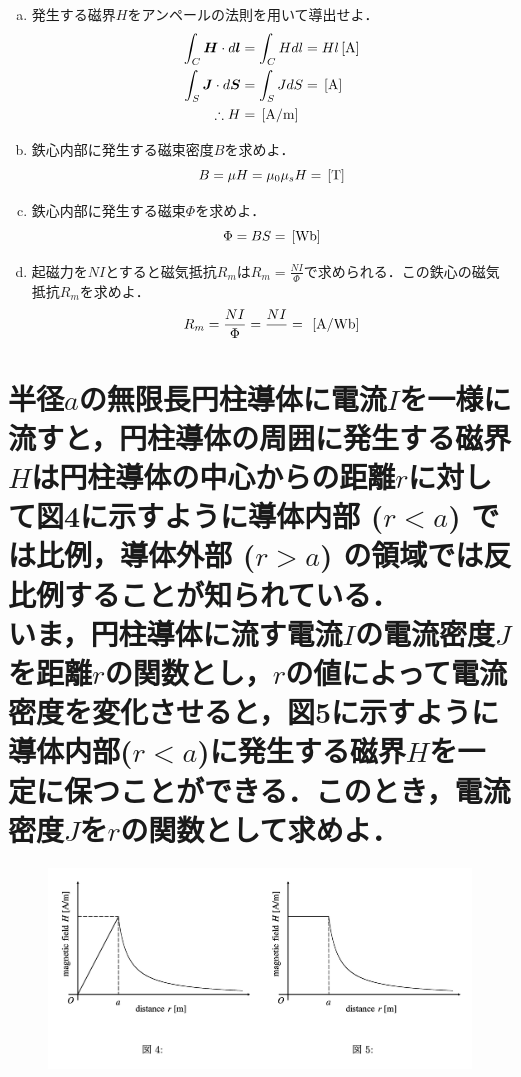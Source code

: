 \documentclass[dvipdfmx]{ujarticle}
\begin{document}
\begin{enumerate}[(a)]
	\item 発生する磁界$H$をアンペールの法則を用いて導出せよ．
	\begin{align*}
	\int_{C}\boldsymbol{H}\cdot d\boldsymbol{l}&=\int_{C}Hdl=Hl\,[\rm{A}]\\
	\int_{S}\boldsymbol{J}\cdot d\boldsymbol{S}&=\int_{S}JdS=\,[\rm{A}]\\
	\therefore H&=\,[\rm{A/m}]
	\end{align*}
	\item 鉄心内部に発生する磁束密度$B$を求めよ．
	\begin{equation*}
	B=\mu H=\mu_{0}\mu_{s}H=\,[\rm{T}]
	\end{equation*}
	\item 鉄心内部に発生する磁束$\Phi$を求めよ．
	\begin{equation*}
	\Phi=BS=\,[\rm{Wb}]
	\end{equation*}
	\item 起磁力を$NI$とすると磁気抵抗$R_{m}$は$R_{m}=\frac{NI}{\Phi}$で求められる．この鉄心の磁気抵抗$R_{m}$を求めよ．
	\begin{equation*}
	R_{m}=\frac{NI}{\Phi}=\frac{NI}{}=\frac{}{}\,[\rm{A/Wb}]
	\end{equation*}
\end{enumerate}

\section{半径$a$の無限長円柱導体に電流$I$を一様に流すと，円柱導体の周囲に発生する磁界$H$は円柱導体の中心からの距離$r$に対して図4に示すように導体内部 ($r < a$) では比例，導体外部 ($r > a$) の領域では反比例することが知られている．\\いま，円柱導体に流す電流$I$の電流密度$J$を距離$r$の関数とし，$r$の値によって電流密度を変化させると，図5に示すように導体内部($r < a$)に発生する磁界$H$を一定に保つことができる．このとき，電流密度$J$を$r$の関数として求めよ．}

\begin{figure}[h]
	\centering
	\includegraphics[scale=0.35]{./fig/e.png}
\end{figure}

\begin{align*}
\end{align*}
\end{document}
